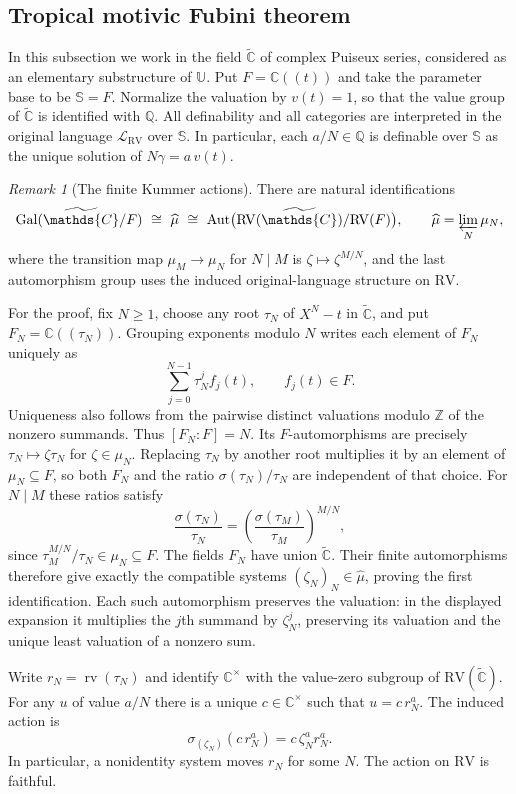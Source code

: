 \documentclass[12pt]{amsart}
\theoremstyle{remark}
\newtheorem{rem}[lem]{Remark}
\newcommand{\C}{\mathds{C}}
\newcommand{\Q}{\mathds{Q}}
\newcommand{\rv}{\operatorname{rv}}
\newcommand{\Gal}{\operatorname{Gal}}
\newcommand{\Aut}{\operatorname{Aut}}
\newcommand{\RV}{\mathrm{RV}}
\newcommand{\Z}{\mathds{Z}}
\newcommand{\Sbase}{\mathbb S}
\newcommand{\RVlang}{\mathcal L_{\mathrm{RV}}}
\numberwithin{equation}{section}
\begin{document}
{\color{ProposalOrange}
\subsection{Tropical motivic Fubini theorem}\label{jp:fubini}
In this subsection we work in the field $\widetilde{\C}$ of complex
Puiseux series, considered as an elementary substructure of
$\mathbb U$. Put $F=\C((t))$ and take the parameter base to be
$\Sbase=F$. Normalize the valuation by $v(t)=1$, so that the
value group of $\widetilde{\C}$ is identified with $\Q$.
All definability and all categories are interpreted in the original
language $\RVlang$ over $\Sbase$. In particular, each
$a/N\in\Q$ is definable over $\Sbase$ as the unique solution of
$N\gamma=a\,v(t)$.

\begin{rem}[The finite Kummer actions]\label{puiseux:kummer:action}
There are natural identifications
\[
 \Gal(\widetilde{\C}/F)\ \cong\ \widehat{\mu}
 \ \cong\ \Aut\bigl(\RV(\widetilde{\C})/\RV(F)\bigr),
 \qquad
 \widehat{\mu}=\varprojlim_N\mu_N,
\]
where the transition map $\mu_M\to\mu_N$ for $N\mid M$
is $\zeta\mapsto\zeta^{M/N}$, and the last automorphism group
uses the induced original-language structure on $\RV$.

For the proof, fix $N\geq1$, choose any root $\tau_N$ of
$X^N-t$ in $\widetilde{\C}$, and put
$F_N=\C((\tau_N))$. Grouping exponents modulo $N$ writes each
element of $F_N$ uniquely as
\[
 \sum_{j=0}^{N-1}\tau_N^j f_j(t),\qquad f_j(t)\in F.
\]
Uniqueness also follows from the pairwise distinct valuations
modulo $\Z$ of the nonzero summands. Thus $[F_N:F]=N$.
Its $F$-automorphisms are precisely
$\tau_N\mapsto\zeta\tau_N$ for $\zeta\in\mu_N$.
Replacing $\tau_N$ by another root multiplies it by an element
of $\mu_N\subseteq F$, so both $F_N$ and the ratio
$\sigma(\tau_N)/\tau_N$ are independent of that choice.
For $N\mid M$ these ratios satisfy
\[
 \frac{\sigma(\tau_N)}{\tau_N}
 =
 \left(\frac{\sigma(\tau_M)}{\tau_M}\right)^{M/N},
\]
since $\tau_M^{M/N}/\tau_N\in\mu_N\subseteq F$.
The fields $F_N$ have union $\widetilde{\C}$.
Their finite automorphisms therefore give exactly the compatible
systems $(\zeta_N)_N\in\widehat{\mu}$, proving the first
identification. Each such automorphism preserves the valuation:
in the displayed expansion it multiplies the $j$th summand by
$\zeta_N^j$, preserving its valuation and the unique least
valuation of a nonzero sum.

Write $r_N=\rv(\tau_N)$ and identify $\C^\times$ with the
value-zero subgroup of $\RV(\widetilde{\C})$.
For any $u$ of value $a/N$ there is a unique $c\in\C^\times$
such that $u=c\,r_N^a$. The induced action is
\[
 \sigma_{(\zeta_N)}(c\,r_N^a)
   =c\,\zeta_N^a r_N^a .
\]
In particular, a nonidentity system moves $r_N$ for some $N$.
The action on $\RV$ is faithful.


\end{rem}}
\end{document}
